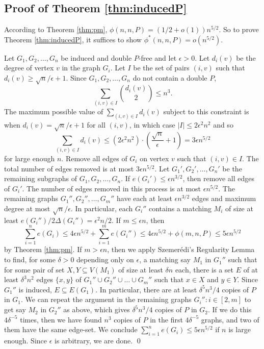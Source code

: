 \documentclass[12pt]{article}
\begin{document}
\subsection{Proof of Theorem \ref{thm:inducedP}}

According to Theorem \ref{thm:pm}, $\phi(n,n,P) = (1/2 + o(1))n^{5/2}$. So to prove Theorem \ref{thm:inducedP}, it suffices to show $\phi^*(n,n,P) = o(n^{5/2})$. 

Let $G_1, G_2, \dots, G_n$ be induced and double $P$-free and let $\epsilon > 0$. Let $d_i(v)$ be the degree of vertex $v$ in the graph $G_i$. Let $I$ be the set of pairs $(i,v)$ such that $d_i(v) \geq \sqrt{n}/\epsilon + 1$. Since $G_1, G_2 ,\dots, G_n$ do not contain a double $P$, 
\[ 
  \sum_{(i,v) \in I} {d_i(v) \choose 2} \leq n^3.
\]
The maximum possible value of $\sum_{(i,v) \in I} d_i(v)$ subject to this constraint is when $d_i(v) = \sqrt{n}/\epsilon + 1$ for all $(i,v)$, in which case $|I| \leq 2\epsilon^2n^2$ and so
\[ 
  \sum_{(i,v) \in I} d_i(v) \leq (2\epsilon^2 n^2) \cdot \left(\frac{\sqrt{n}}{\epsilon} + 1\right) = 3\epsilon n^{5/2}
\]
for large enough $n$. Remove all edges of $G_i$ on vertex $v$ such that $(i,v) \in I$. The total number of edges removed is at most $3\epsilon n^{5/2}$. Let $G_1', G_2', \dots, G_n'$ be the remaining subgraphs of $G_1, G_2, \dots, G_n$. If $e(G_i') \leq \epsilon n^{3/2}$, then remove all edges of $G_i'$. The number of edges removed in this process is at most $\epsilon n^{5/2}$. The remaining graphs $G_1'', G_2'', \dots, G_m''$ have each at least $\epsilon n^{3/2}$ edges and maximum degree at most $\sqrt{n}/\epsilon$. In particular, each $G_i''$ contains a matching $M_i$ of size at least $e(G_i'')/2\Delta(G_i'') = \epsilon^2 n/2$. If $m \leq \epsilon n$, then 
\[ 
  \sum_{i = 1}^n e(G_i) \leq 4\epsilon n^{5/2} + \sum_{i = 1}^m e(G_i'') \leq 4\epsilon n^{5/2} + \phi(m, n, P) \leq 5\epsilon n^{5/2}
\]
by Theorem \ref{thm:pm}. If $m > \epsilon n$, then we apply Szemer\'{e}di's Regularity Lemma to find, for some $\delta > 0$ depending only on $\epsilon$, a matching say $M_1$ in $G_1''$ such that for some pair of set $X, Y \subseteq V(M_1)$ of size at least $\delta n$ each, there is a set $E$ of at least $\delta^3 n^2$ edges $\{x, y\}$ of $G_1'' \cup G_2'' \cup \dots \cup G_m''$ such that $x \in X$ and $y \in Y$. Since $G_1''$ is induced, $E \subseteq E(G_1)$. In particular, there are at least $\delta^5 n^3/4$ copies of $P$ in $G_1$. We can repeat the argument in the remaining graphs $G_i'' : i \in [2,m]$ to get say $M_2$ in $G_2''$ as above, which gives $\delta^5 n^3/4$ copies of $P$ in $G_2$. If we do this $4\delta^{-5}$ times, then we have found $n^3$ copies of $P$ in the first $4\delta^{-5}$ graphs, and two of them have the same edge-set. We conclude $\sum_{i = 1}^n e(G_i) \leq 5\epsilon n^{5/2}$ if $n$ is large enough. Since $\epsilon$ is arbitrary, we are done. \qed
\end{document}
